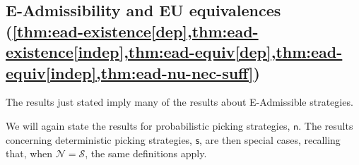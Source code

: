 \documentclass[a4paper]{article}
\renewcommand\S{\mathcal{S}}
\newcommand\s{\mathsf{s}}
\newcommand{\n}{\mathsf{n}}
\renewcommand{\nu}{\n}
\newcommand\Nu{\mathcal{N}}
\renewcommand{\color}[1]{}
\newenvironment{colored}[1]{\leavevmode\color{#1}}{}
\newenvironment{CCM rewritten}
{\begingroup\color{blue}} %
{\endgroup}              %
\begin{document}
\subsection{E-Admissibility and EU equivalences\\  (\cref{thm:ead-existence[dep],thm:ead-existence[indep],thm:ead-equiv[dep],thm:ead-equiv[indep],thm:ead-nu-nec-suff})}\label{sect:EAd-EU-appendix}
The results just stated imply many of the results about E-Admissible strategies.

We will again state the results for probabilistic picking strategies, $\nu$. The results concerning deterministic picking strategies, $\s$, are then special cases, recalling that, when $\Nu=\S$, the same definitions apply.
 
\end{document}
